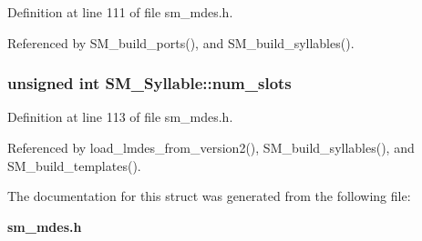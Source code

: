 Definition at line 111 of file sm\_\-mdes.h.

Referenced by SM\_\-build\_\-ports(), and SM\_\-build\_\-syllables().
\subsubsection{\setlength{\rightskip}{0pt plus 5cm}unsigned int \bf{SM\_\-Syllable::num\_\-slots}}\label{structSM__Syllable_61c9e777787582828c4a220d5bdf7017}




Definition at line 113 of file sm\_\-mdes.h.

Referenced by load\_\-lmdes\_\-from\_\-version2(), SM\_\-build\_\-syllables(), and SM\_\-build\_\-templates().

The documentation for this struct was generated from the following file:\begin{CompactItemize}
\item 
\bf{sm\_\-mdes.h}\end{CompactItemize}
